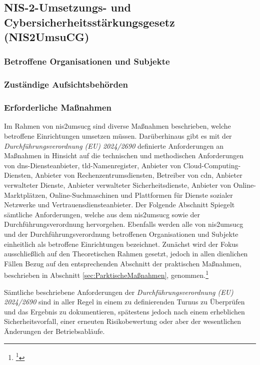 \documentclass[11pt,a4paper,hidelinks]{article}   %
\begin{document}
        \subsection{NIS-2-Umsetzungs- und Cybersicherheitsstärkungsgesetz (NIS2UmsuCG)}
            \subsubsection{Betroffene Organisationen und Subjekte}
            \subsubsection{Zuständige Aufsichtsbehörden}
            \subsubsection{Erforderliche Maßnahmen}
                Im Rahmen von \gls{nis2umsucg} sind diverse Maßnahmen beschrieben, welche betroffene Einrichtungen umsetzen müssen. Darüberhinaus gibt es mit der \emph{Durchführungsverordnung (EU) 2024/2690} definierte Anforderungen an Maßnahmen in Hinsicht auf die technischen und methodischen Anforderungen von \gls{dns}-Diensteanbieter, \gls{tld}-Namenregister, Anbieter von Cloud-Computing-Diensten, Anbieter von Rechenzent­rumsdiensten, Betreiber von \gls{cdn}, Anbieter verwalteter Dienste, Anbieter verwalteter Sicherheitsdienste, Anbieter von Online-Marktplätzen, Online-Suchmaschinen und Plattformen für Dienste sozialer Netzwerke und Vertrauensdiensteanbieter. Der Folgende Abschnitt Spiegelt sämtliche Anforderungen, welche aus dem \gls{nis2umsucg} sowie der Durchführungsverordnung hervorgehen. Ebenfalls werden alle von \gls{nis2umsucg} und der Durchführungsverordnung betroffenen Organisationen und Subjekte einheitlich als betroffene Einrichtungen bezeichnet. Zunächst wird der Fokus ausschließlich auf den Theoretischen Rahmen gesetzt, jedoch in allen dienlichen Fällen Bezug auf den entsprechenden Abschnitt der praktischen Maßnahmen, beschrieben in Abschnitt \ref{sec:ParktischeMaßnahmen}, genommen.\footnote{
                    \footcite{MISSING}
                }\medbreak
                
                Sämtliche beschriebene Anforderungen der \emph{Durchführungsverordnung (EU) 2024/2690} sind in aller Regel in einem zu definierenden Turnus zu Überprüfen und das Ergebnis zu dokumentieren, spätestens jedoch nach einem erheblichen Sicherheitsvorfall, einer erneuten Risikobewertung oder aber der wesentlichen  Änderungen  der  Betriebsabläufe.\medbreak
\end{document}

